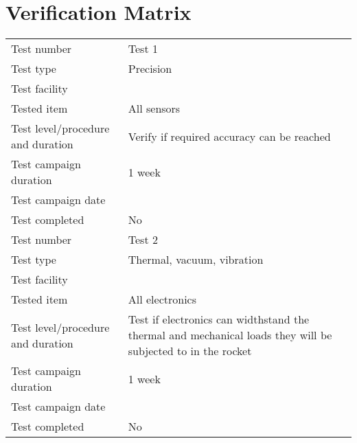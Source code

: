 \documentclass[11pt]{scrartcl}
\begin{document}
 \section{Verification Matrix}
 \begin{center}
	\begin{longtable}{| p{} | p{} |}
		\hline
		
		Test number & Test 1 \\
		Test type & Precision \\
		Test facility &  \\
		Tested item & All sensors \\
		Test level/procedure and duration & Verify if required accuracy can be reached \\
		Test campaign duration & 1 week \\
		Test campaign date &  \\
		Test completed & No \\
		
		\hline\hline
		
		Test number & Test 2 \\
		Test type & Thermal, vacuum, vibration \\
		Test facility &  \\
		Tested item & All electronics \\
		Test level/procedure and duration & Test if electronics can widthstand the thermal and mechanical loads they will be subjected to in the rocket \\
		Test campaign duration & 1 week \\
		Test campaign date &  \\
		Test completed & No \\
		\hline
		
	\end{longtable}
\end{center}
 
\end{document}
